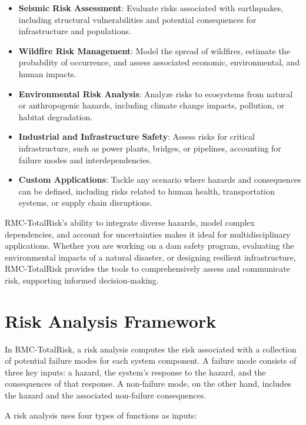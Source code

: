 \documentclass[
]{book}
\begin{document}
\begin{itemize}
\item
  \textbf{Seismic Risk Assessment}: Evaluate risks associated with earthquakes, including structural vulnerabilities and potential consequences for infrastructure and populations.
\item
  \textbf{Wildfire Risk Management}: Model the spread of wildfires, estimate the probability of occurrence, and assess associated economic, environmental, and human impacts.
\item
  \textbf{Environmental Risk Analysis}: Analyze risks to ecosystems from natural or anthropogenic hazards, including climate change impacts, pollution, or habitat degradation.
\item
  \textbf{Industrial and Infrastructure Safety}: Assess risks for critical infrastructure, such as power plants, bridges, or pipelines, accounting for failure modes and interdependencies.
\item
  \textbf{Custom Applications}: Tackle any scenario where hazards and consequences can be defined, including risks related to human health, transportation systems, or supply chain disruptions.
\end{itemize}

RMC-TotalRisk's ability to integrate diverse hazards, model complex dependencies, and account for uncertainties makes it ideal for multidisciplinary applications. Whether you are working on a dam safety program, evaluating the environmental impacts of a natural disaster, or designing resilient infrastructure, RMC-TotalRisk provides the tools to comprehensively assess and communicate risk, supporting informed decision-making.

\hypertarget{risk-analysis-framework}{%
\chapter{Risk Analysis Framework}\label{risk-analysis-framework}}

In RMC-TotalRisk, a risk analysis computes the risk associated with a collection of potential failure modes for each system component. A failure mode consists of three key inputs: a hazard, the system's response to the hazard, and the consequences of that response. A non-failure mode, on the other hand, includes the hazard and the associated non-failure consequences.

A risk analysis uses four types of functions as inputs:
\end{document}
